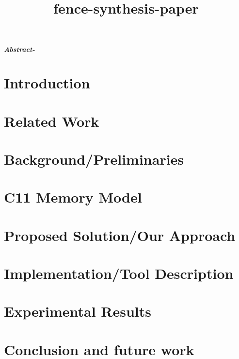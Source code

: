 \documentclass{article}
\title{fence-synthesis-paper}
\date{}
\begin{document}
\maketitle
\textit{\textbf{Abstract-}}

\section{Introduction} \label{sec:intro}


\section{Related Work} \label{sec:related}


\section{Background/Preliminaries} \label{sec:prelim}


\section{C11 Memory Model} \label{sec:c11 model}


\section{Proposed Solution/Our Approach}\label{sec:approach}


\section{Implementation/Tool Description}


\section{Experimental Results}


\section{Conclusion and future work}




\end{document}
